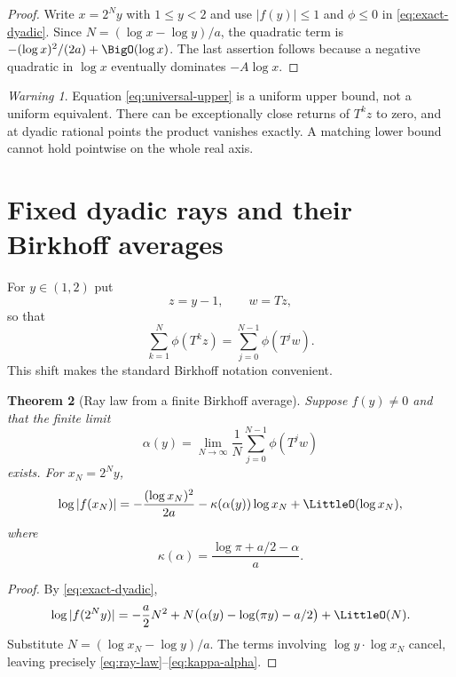 \documentclass[11pt,oneside]{article}
\newtheorem{theorem}{Theorem}[section]
\theoremstyle{definition}
\theoremstyle{remark}
\newtheorem{warning}[theorem]{Warning}
\newcommand{\T}{T}
\begin{document}
\begin{proof}
Write $x=2^Ny$ with $1\le y<2$ and use
$|f(y)|\le1$ and $\phi\le0$ in \eqref{eq:exact-dyadic}.  Since
$N=(\log x-\log y)/a$, the quadratic term is
$-(\log x)^2/(2a)+\BigO(\log x)$.  The last assertion follows because a
negative quadratic in $\log x$ eventually dominates $-A\log x$.
\end{proof}

\begin{warning}
Equation \eqref{eq:universal-upper} is a uniform upper bound, not a uniform
equivalent.  There can be exceptionally close returns of $\T^kz$ to zero, and
at dyadic rational points the product vanishes exactly.  A matching lower bound
cannot hold pointwise on the whole real axis.
\end{warning}

\section{Fixed dyadic rays and their Birkhoff averages}

For $y\in(1,2)$ put
\[
 z=y-1,\qquad w=\T z,
\]
so that
\[
 \sum_{k=1}^{N}\phi(\T^kz)
 =\sum_{j=0}^{N-1}\phi(\T^jw).
\]
This shift makes the standard Birkhoff notation convenient.

\begin{theorem}[Ray law from a finite Birkhoff average]
Suppose $f(y)\ne0$ and that the finite limit
\begin{equation}
 \alpha(y)=\lim_{N\to\infty}\frac1N
 \sum_{j=0}^{N-1}\phi(\T^jw)                               \label{eq:alpha-def}
\end{equation}
exists.  For $x_N=2^Ny$,
\begin{equation}
 \log|f(x_N)|
 =-\frac{(\log x_N)^2}{2a}
  -\kappa(\alpha(y))\log x_N+\LittleO(\log x_N),            \label{eq:ray-law}
\end{equation}
where
\begin{equation}
 \kappa(\alpha)=\frac{\log\pi+a/2-\alpha}{a}.              \label{eq:kappa-alpha}
\end{equation}
\end{theorem}

\begin{proof}
By \eqref{eq:exact-dyadic},
\[
 \log|f(2^Ny)|
 =-\frac a2N^2+
 N\bigl(\alpha(y)-\log(\pi y)-a/2\bigr)+\LittleO(N).
\]
Substitute $N=(\log x_N-\log y)/a$.  The terms involving
$\log y\cdot\log x_N$ cancel, leaving precisely
\eqref{eq:ray-law}--\eqref{eq:kappa-alpha}.
\end{proof}
\end{document}
